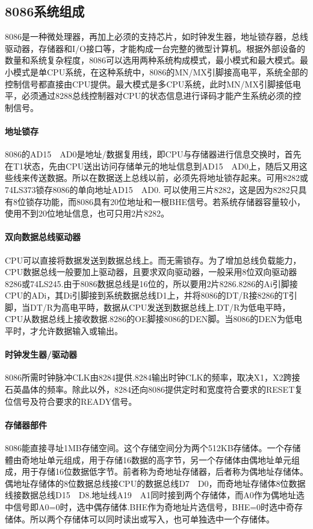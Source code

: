 \documentclass[12pt]{article}
\begin{document}
\subsection{8086系统组成}
8086是一种微处理器，再加上必须的支持芯片，如时钟发生器，地址锁存器，总线驱动器，存储器和I/O接口等，才能构成一台完整的微型计算机。根据外部设备的数量和系统复杂程度，8086可以选用两种系统构成模式，最小模式和最大模式。最小模式是单CPU系统，在这种系统中，8086的MN/MX引脚接高电平，系统全部的控制信号都直接由CPU提供。最大模式是多CPU系统，此时MN/MX引脚接低电平，必须通过8288总线控制器对CPU的状态信息进行译码才能产生系统必须的控制信号。
\paragraph{地址锁存}
8086的AD15~~AD0是地址/数据复用线，即CPU与存储器进行信息交换时，首先在T1状态，先由CPU送出访问存储单元的地址信息到AD15~~AD0上，随后又用这些线来传送数据。所以在数据送上总线以前，必须先将地址锁存起来。可用8282或74LS373锁存8086的单向地址AD15~~AD0. 可以使用三片8282，这是因为8282只具有8位锁存功能，而8086具有20位地址和一根BHE信号。若系统存储器容量较小，使用不到20位地址信息，也可只用2片8282。
\paragraph{双向数据总线驱动器}
CPU可以直接将数据发送到数据总线上。而无需锁存。为了增加总线负载能力，CPU数据总线一般要加上驱动器，且要求双向驱动器，一般采用8位双向驱动器8286或74LS245.由于8086数据总线是16位的，所以要用2片8286.8286的Ai引脚接CPU的ADi，其Di引脚接到系统数据总线D1上，并将8086的DT/R接8286的T引脚，当DT/R为高电平時，数据从CPU发送到数据总线上.DT/R为低电平時，CPU从数据总线上接收数据.8286的OE脚接8086的DEN脚。当8086的DEN为低电平时，才允许数据输入或输出。
\paragraph{时钟发生器/驱动器}
8086所需时钟脉冲CLK由8284提供.8284输出时钟CLK的频率，取决X1，X2跨接石英晶体的频率。除此以外，8284还向8086提供定时和宽度符合要求的RESET复位信号及符合要求的READY信号。
\paragraph{存储器部件}
8086能直接寻址1MB存储空间。这个存储空间分为两个512KB存储体。一个存储體由奇地址单元组成，用于存储16数据的高字节，另一个存储体由偶地址单元组成，用于存储16位数据低字节。前者称为奇地址存储器，后者称为偶地址存储体。偶地址存储体的8位数据总线接CPU的数据总线D7~~D0，而奇地址存储体8位数据线接数据总线D15~~D8.地址线A19~~A1同时接到两个存储体，而A0作为偶地址选中信号即A0=0时，选中偶存储体.BHE作为奇地址片选信号，BHE=0时选中奇存储体。所以两个存储体可以同时读出或写入，也可单独选中一个存储体。
\end{document}
